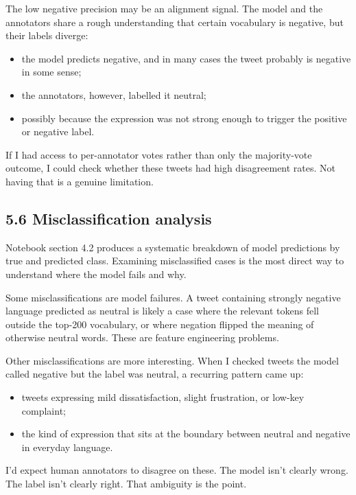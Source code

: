 \documentclass[12pt]{article}
\begin{document}
The low negative precision may be an alignment signal. The model and the annotators share a rough understanding that certain vocabulary is negative, but their labels diverge:

\begin{itemize}

  \item the model predicts negative, and in many cases the tweet probably is negative in some sense;

  \item the annotators, however, labelled it neutral;

  \item possibly because the expression was not strong enough to trigger the positive or negative label.

\end{itemize} If I had access to per-annotator votes rather than only the majority-vote outcome, I could check whether these tweets had high disagreement rates. Not having that is a genuine limitation.



\subsection*{5.6 Misclassification analysis}



Notebook section 4.2 produces a systematic breakdown of model predictions by true and predicted class. Examining misclassified cases is the most direct way to understand where the model fails and why.

Some misclassifications are model failures. A tweet containing strongly negative language predicted as neutral is likely a case where the relevant tokens fell outside the top-200 vocabulary, or where negation flipped the meaning of otherwise neutral words. These are feature engineering problems.

Other misclassifications are more interesting. When I checked tweets the model called negative but the label was neutral, a recurring pattern came up:

\begin{itemize}

  \item tweets expressing mild dissatisfaction, slight frustration, or low-key complaint;

  \item the kind of expression that sits at the boundary between neutral and negative in everyday language.

\end{itemize} I'd expect human annotators to disagree on these. The model isn't clearly wrong. The label isn't clearly right. That ambiguity is the point.
\end{document}
